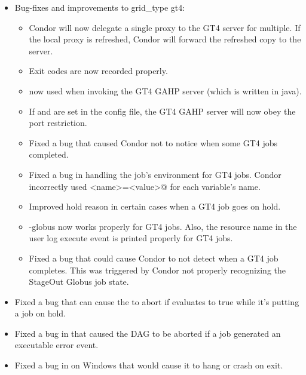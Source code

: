 \begin{itemize}
\item Bug-fixes and improvements to grid\_type gt4:

  \begin{itemize}

  \item Condor will now delegate a single proxy to the GT4 server for
  multiple. If the local proxy is refreshed, Condor will forward the
  refreshed copy to the server.

  \item Exit codes are now recorded properly.

  \item {} now used when invoking the GT4 GAHP
  server (which is written in java).

  \item If  and  are set in the config file,
  the GT4 GAHP server will now obey the port restriction.

  \item Fixed a bug that caused Condor not to notice when some GT4 jobs
  completed.

  \item Fixed a bug in handling the job's environment for GT4 jobs. Condor
  incorrectly used \verb@<name>=<value>@ for each variable's name.

  \item Improved hold reason in certain cases when a GT4 job goes on hold.

  \item {} -globus now works properly for GT4 jobs. Also, the resource
  name in the user log execute event is printed properly for GT4 jobs.

  \item Fixed a bug that could cause Condor to not detect when a GT4 job
  completes. This was triggered by Condor not properly recognizing the
  StageOut Globus job state.

  \end{itemize}

\item Fixed a bug that can cause the  to abort if
 evaluates to true while it's putting a job on hold.

\item Fixed a bug in  that
caused the DAG to be aborted if a job generated an executable error
event.

\item Fixed a bug in  on Windows that would cause it to
hang or crash on exit.


\end{itemize}
